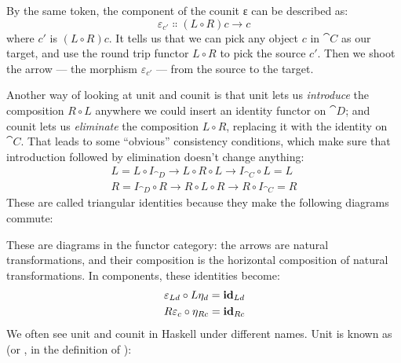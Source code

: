 \noindent
By the same token, the component of the counit ε can be described as:
\[\varepsilon_{c'} \Colon (L \circ R) c \to c\]
where $c'$ is $(L \circ R) c$. It tells us that we
can pick any object $c$ in $\cat{C}$ as our target, and use the
round trip functor $L \circ R$ to pick the source
$c'$. Then we shoot the arrow --- the morphism
$\varepsilon_{c'}$ --- from the source to the target.

Another way of looking at unit and counit is that unit lets us
\emph{introduce} the composition $R \circ L$ anywhere we could
insert an identity functor on $\cat{D}$; and counit lets us
\emph{eliminate} the composition $L \circ R$, replacing it with the
identity on $\cat{C}$. That leads to some ``obvious'' consistency
conditions, which make sure that introduction followed by elimination
doesn't change anything:
\begin{gather*}
L = L \circ I_{\cat{D}} \to L \circ R \circ L \to I_{\cat{C}} \circ L = L \\
R = I_{\cat{D}} \circ R \to R \circ L \circ R \to R \circ I_{\cat{C}} = R
\end{gather*}
These are called triangular identities because they make the following
diagrams commute:

\begin{figure}[H]
  \centering

  \begin{subfigure}
    \centering
  \end{subfigure}%
  \hspace{1cm}
  \begin{subfigure}
    \centering
  \end{subfigure}
\end{figure}

\noindent
These are diagrams in the functor category: the arrows are natural
transformations, and their composition is the horizontal composition of
natural transformations. In components, these identities become:
\begin{gather*}
\varepsilon_{L d} \circ L \eta_d = \mathbf{id}_{L d} \\
R \varepsilon_c \circ \eta_{R c} = \mathbf{id}_{R c}
\end{gather*}
We often see unit and counit in Haskell under different names. Unit is
known as  (or , in the definition of
):

